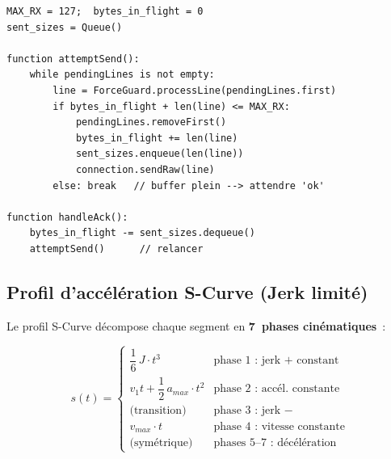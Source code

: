 \documentclass[12pt,a4paper]{report}
\begin{document}
\begin{lstlisting}[caption={Pseudocode --- algorithme Character-Counting.}, label={alg:streaming}]
MAX_RX = 127;  bytes_in_flight = 0
sent_sizes = Queue()

function attemptSend():
    while pendingLines is not empty:
        line = ForceGuard.processLine(pendingLines.first)
        if bytes_in_flight + len(line) <= MAX_RX:
            pendingLines.removeFirst()
            bytes_in_flight += len(line)
            sent_sizes.enqueue(len(line))
            connection.sendRaw(line)
        else: break   // buffer plein --> attendre 'ok'

function handleAck():
    bytes_in_flight -= sent_sizes.dequeue()
    attemptSend()      // relancer
\end{lstlisting}

\subsection{Profil d'accélération S-Curve (Jerk limité)}

Le profil S-Curve décompose chaque segment en \textbf{7~phases cinématiques}~:

\begin{equation}
s(t) = \begin{cases}
\dfrac{1}{6}\,J \cdot t^3 & \text{phase 1 : jerk + constant} \\[4pt]
v_1 t + \dfrac{1}{2}\,a_{max} \cdot t^2 & \text{phase 2 : accél. constante} \\[4pt]
\text{(transition)} & \text{phase 3 : jerk $-$} \\[4pt]
v_{max} \cdot t & \text{phase 4 : vitesse constante} \\[4pt]
\text{(symétrique)} & \text{phases 5--7 : décélération}
\end{cases}
\label{eq:scurve}
\end{equation}
\end{document}
